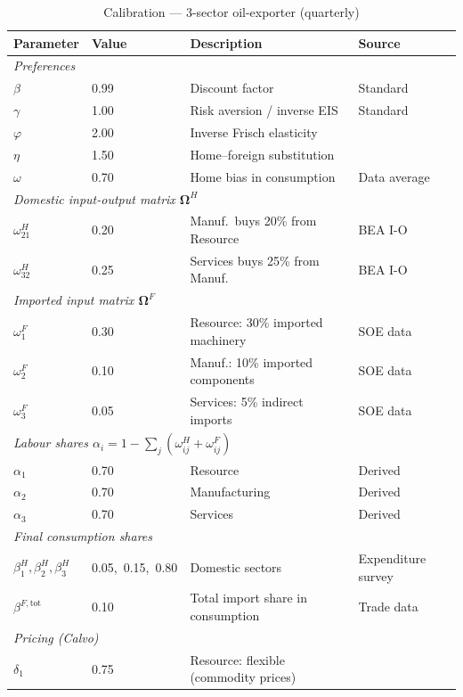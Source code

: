\documentclass[11pt,a4paper]{article}
\newcommand{\OmH}{\bm\Omega^{H}}
\newcommand{\OmF}{\bm\Omega^{F}}
\begin{document}
\begin{table}[h!]
\centering
\caption{Calibration --- 3-sector oil-exporter (quarterly)}
\label{tab:calib}
\begin{tabular}{llll}
\toprule
\textbf{Parameter} & \textbf{Value} & \textbf{Description} & \textbf{Source}\\
\midrule
\multicolumn{4}{l}{\textit{Preferences}}\\
$\beta$ & 0.99 & Discount factor & Standard\\
$\gamma$ & 1.00 & Risk aversion / inverse EIS & Standard\\
$\varphi$ & 2.00 & Inverse Frisch elasticity & \citet{Smets2003}\\
$\eta$ & 1.50 & Home–foreign substitution & \citet{Gali2005}\\
$\omega$ & 0.70 & Home bias in consumption & Data average\\
\midrule
\multicolumn{4}{l}{\textit{Domestic input-output matrix $\OmH$}}\\
$\omega^H_{21}$ & 0.20 & Manuf.\ buys 20\% from Resource & BEA I-O\\
$\omega^H_{32}$ & 0.25 & Services buys 25\% from Manuf. & BEA I-O\\
\midrule
\multicolumn{4}{l}{\textit{Imported input matrix $\OmF$}}\\
$\omega^F_1$ & 0.30 & Resource: 30\% imported machinery & SOE data\\
$\omega^F_2$ & 0.10 & Manuf.: 10\% imported components & SOE data\\
$\omega^F_3$ & 0.05 & Services: 5\% indirect imports & SOE data\\
\midrule
\multicolumn{4}{l}{\textit{Labour shares $\alpha_i=1-\sum_j(\omega^H_{ij}+\omega^F_{ij})$}}\\
$\alpha_1$ & 0.70 & Resource & Derived\\
$\alpha_2$ & 0.70 & Manufacturing & Derived\\
$\alpha_3$ & 0.70 & Services & Derived\\
\midrule
\multicolumn{4}{l}{\textit{Final consumption shares}}\\
$\beta^H_1,\beta^H_2,\beta^H_3$ & 0.05,\ 0.15,\ 0.80 & Domestic sectors & Expenditure survey\\
$\beta^{F,\text{tot}}$ & 0.10 & Total import share in consumption & Trade data\\
\midrule
\multicolumn{4}{l}{\textit{Pricing (Calvo)}}\\
$\delta_1$ & 0.75 & Resource: flexible (commodity prices) & \citet{Pasten2017}\\

\end{tabular}
\end{table}
\end{document}
